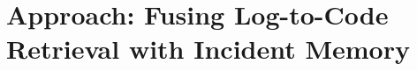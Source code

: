 \section{Approach: Fusing Log-to-Code Retrieval with Incident Memory}
\label{sec:approach}

%
%
%
%
